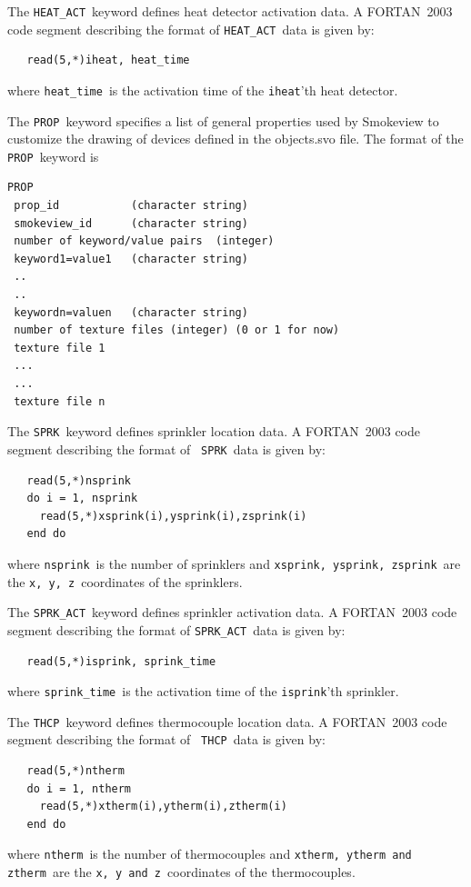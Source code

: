 \documentclass[11pt,twoside]{book}
\newcommand{\hitem}[1]{\item[{\bf #1} \hfill]}
\begin{document}
\hitem{HEAT\_ACT}The {\tt HEAT\_ACT}\ keyword defines heat detector
activation data. A FORTAN~2003 code segment describing the format
of {\tt HEAT\_ACT}\ data is given by:
\begin{lstlisting}
   read(5,*)iheat, heat_time
\end{lstlisting}
where {\tt heat\_time}\ is the activation time of the {\tt iheat}'th heat
detector.

\hitem{PROP}The {\tt PROP}\ keyword specifies
a list of general properties used
by Smokeview to customize the drawing of devices defined in
the objects.svo file.
The format of the {\tt PROP}\ keyword is

\begin{lstlisting}
PROP
 prop_id           (character string)
 smokeview_id      (character string)
 number of keyword/value pairs  (integer)
 keyword1=value1   (character string)
 ..
 ..
 keywordn=valuen   (character string)
 number of texture files (integer) (0 or 1 for now)
 texture file 1
 ...
 ...
 texture file n
\end{lstlisting}

\hitem{SPRK}The {\tt SPRK}\ keyword defines sprinkler location
data. A FORTAN~2003 code segment describing the format of {\tt
SPRK}\ data is given by:
\begin{lstlisting}
   read(5,*)nsprink
   do i = 1, nsprink
     read(5,*)xsprink(i),ysprink(i),zsprink(i)
   end do
\end{lstlisting}
where {\tt nsprink}\ is the number of sprinklers and
{\tt xsprink, ysprink, zsprink}\ are the {\tt x, y, z}\
coordinates of the sprinklers.

\hitem{SPRK\_ACT}The {\tt SPRK\_ACT}\ keyword defines sprinkler
activation data. A FORTAN~2003 code segment describing the format
of {\tt SPRK\_ACT}\ data is given by:
\begin{lstlisting}
   read(5,*)isprink, sprink_time
\end{lstlisting}
where {\tt sprink\_time}\ is the activation time of the {\tt isprink}'th sprinkler.

\hitem{THCP}The {\tt THCP}\ keyword defines thermocouple location
data. A FORTAN~2003 code segment describing the format of {\tt
THCP}\ data is given by:
\begin{lstlisting}
   read(5,*)ntherm
   do i = 1, ntherm
     read(5,*)xtherm(i),ytherm(i),ztherm(i)
   end do
\end{lstlisting}
where {\tt ntherm}\ is the number of thermocouples and
{\tt xtherm, ytherm and ztherm}\ are the {\tt x, y and z}\
coordinates of the thermocouples.
\end{document}
